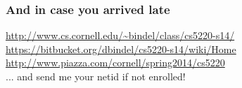 \documentclass{beamer}
\begin{document}
\begin{frame}
  \frametitle{And in case you arrived late}

  \begin{center}
  {\small \url{http://www.cs.cornell.edu/~bindel/class/cs5220-s14/}} \\
  {\small \url{https://bitbucket.org/dbindel/cs5220-s14/wiki/Home}} \\
  {\small \url{http://www.piazza.com/cornell/spring2014/cs5220}}
  \\[1cm]
  ... and send me your netid if not enrolled!
  \end{center}

\end{frame}
\end{document}
